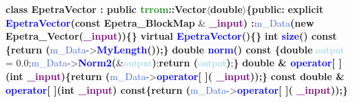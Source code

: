     \newline\textbf{class \textcolor{Melon}{EpetraVector} : public \textcolor{ForestGreen}{trrom}::\textcolor{Melon}{Vector}$\mathbf{\langle}$\textcolor{BrickRed}{double}$\mathbf{\rangle}$\{}\newline\textbf{public:}\newline
    \tab\textbf{explicit} \textbf{\textcolor{blue}{EpetraVector}(const \textcolor{Melon}{Epetra\_BlockMap}} \& \textbf{\textcolor{Purple}{ \_input}) :}\newline\tab\tab\textcolor{RoyalBlue}{m\_Data}\textbf{(new \textcolor{Melon}{Epetra\_Vector}(\textcolor{Purple}{\_input}))\{\}}\newline
    \tab\textbf{virtual \textcolor{blue}{\detokenize{~}EpetraVector}()\{\}}\newline\newline
    \tab\textbf{\textcolor{BrickRed}{int} \textcolor{blue}{size}() const \{}\textbf{return (}\textcolor{RoyalBlue}{m\_Data}-\textgreater\textbf{\textcolor{blue}{MyLength}());\}}\newline
    \tab\textbf{\textcolor{BrickRed}{double} \textcolor{blue}{norm}() const \{}\newline\tab\tab\textbf{\textcolor{BrickRed}{double}} \textcolor{SkyBlue}{output} = 0.0;\newline\tab\tab\textcolor{RoyalBlue}{m\_Data}-\textgreater\textbf{\textcolor{blue}{Norm2}(}\&\textcolor{SkyBlue}{output}\textbf{)};\newline\tab\tab\textbf{return (}\textcolor{SkyBlue}{output}\textbf{)};\newline\tab\textbf{\}}\newline
    \tab\textbf{\textcolor{BrickRed}{double}  \& \textcolor{blue}{operator}[ ](\textcolor{BrickRed}{int} \textcolor{Purple}{ \_input})}\newline\tab\tab\textbf{\{return (}\textcolor{RoyalBlue}{m\_Data}-\textgreater\textbf{\textcolor{blue}{operator}[ ](\textcolor{Purple}{ \_input}));\}}\newline
    \tab\textbf{const \textcolor{BrickRed}{double}  \& \textcolor{blue}{operator}[ ](\textcolor{BrickRed}{int} \textcolor{Purple}{ \_input}) const}\newline\tab\tab\textbf{\{return (}\textcolor{RoyalBlue}{m\_Data}-\textgreater\textbf{\textcolor{blue}{operator}[ ](\textcolor{Purple}{ \_input}));\}}\newline\newline
